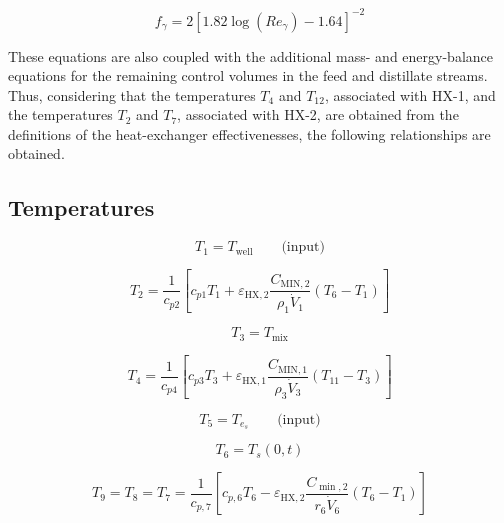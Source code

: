 \documentclass[14pt,letterpaper,fleqn]{extarticle}
\begin{document}
\begin{equation}
f_{\gamma}
=
2
\left[
1.82\log\left(Re_{\gamma}\right)-1.64
\right]^{-2}
\label{eq:friction-factor-gamma}
\end{equation}

These equations are also coupled with the additional mass- and energy-balance
equations for the remaining control volumes in the feed and distillate streams.
Thus, considering that the temperatures $T_4$ and $T_{12}$, associated with HX-1, and the
temperatures $T_2$ and $T_7$, associated with HX-2, are obtained from the
definitions of the heat-exchanger effectivenesses, the following relationships are obtained.

\subsection*{Temperatures}

\begin{equation}
T_{1} = T_{\mathrm{well}}
\qquad \text{(input)}
\label{eq:T1}
\end{equation}

\begin{equation}
T_{2}
=
\frac{1}{c_{p2}}
\left[
c_{p1}T_{1}
+
\varepsilon_{\mathrm{HX},2}
\frac{C_{\mathrm{MIN},2}}
{\rho_{1}\dot{V}_{1}}
\left(T_{6}-T_{1}\right)
\right]
\label{eq:T2}
\end{equation}

\begin{equation}
T_{3} = T_{\mathrm{mix}}
\label{eq:T3}
\end{equation}

\begin{equation}
T_{4}
=
\frac{1}{c_{p4}}
\left[
c_{p3}T_{3}
+
\varepsilon_{\mathrm{HX},1}
\frac{C_{\mathrm{MIN},1}}
{\rho_{3}\dot{V}_{3}}
\left(T_{11}-T_{3}\right)
\right]
\label{eq:T4}
\end{equation}

\begin{equation}
T_{5} = T_{e_s}
\qquad \text{(input)}
\label{eq:T5}
\end{equation}

\begin{equation}
T_{6} = T_{s}(0,t)
\label{eq:T6}
\end{equation}

\begin{equation}
T_9
=
T_8
=
T_7
=
\frac{1}{c_{p,7}}
\left[
c_{p,6}T_6
-
\varepsilon_{\mathrm{HX},2}
\frac{C_{\min,2}}
{r_6\dot{V}_6}
\left(
T_6-T_1
\right)
\right]
\label{eq:T7-T9}
\end{equation}
\end{document}
